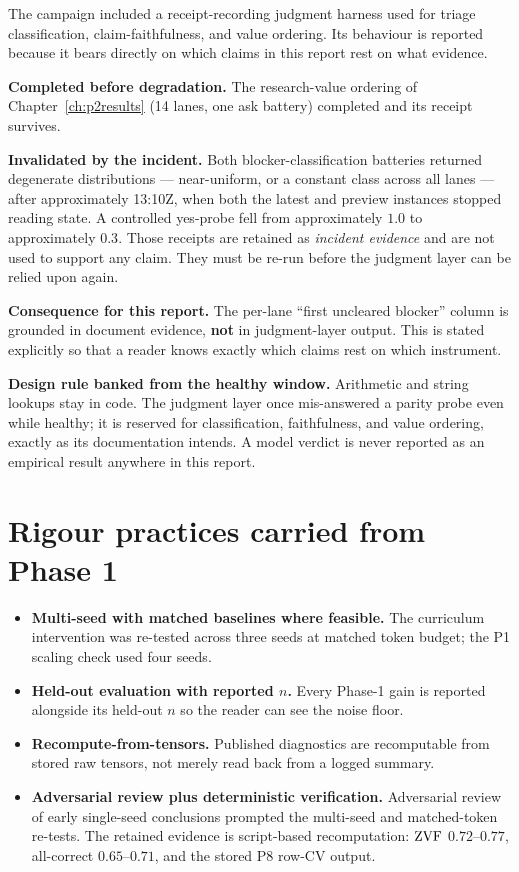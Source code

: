 The campaign included a receipt-recording judgment harness used for triage
classification, claim-faithfulness, and value ordering. Its behaviour is reported
because it bears directly on which claims in this report rest on what evidence.

\textbf{Completed before degradation.} The research-value ordering of
Chapter~\ref{ch:p2results} (14 lanes, one ask battery) completed and its receipt
survives.

\textbf{Invalidated by the incident.} Both blocker-classification batteries
returned degenerate distributions --- near-uniform, or a constant class across all
lanes --- after approximately 13:10Z, when both the latest and preview instances
stopped reading state. A controlled yes-probe fell from approximately $1.0$ to
approximately $0.3$. Those receipts are retained as \emph{incident evidence} and
are not used to support any claim. They must be re-run before the judgment layer
can be relied upon again.

\textbf{Consequence for this report.} The per-lane ``first uncleared blocker''
column is grounded in document evidence, \textbf{not} in judgment-layer output.
This is stated explicitly so that a reader knows exactly which claims rest on
which instrument.

\textbf{Design rule banked from the healthy window.} Arithmetic and string
lookups stay in code. The judgment layer once mis-answered a parity probe even
while healthy; it is reserved for classification, faithfulness, and value
ordering, exactly as its documentation intends. A model verdict is never reported
as an empirical result anywhere in this report.

\section{Rigour practices carried from Phase 1}

\begin{itemize}[leftmargin=1.4em,itemsep=2pt]
  \item \textbf{Multi-seed with matched baselines where feasible.} The curriculum
  intervention was re-tested across three seeds at matched token budget; the P1
  scaling check used four seeds.
  \item \textbf{Held-out evaluation with reported $n$.} Every Phase-1 gain is
  reported alongside its held-out $n$ so the reader can see the noise floor.
  \item \textbf{Recompute-from-tensors.} Published diagnostics are recomputable
  from stored raw tensors, not merely read back from a logged summary.
  \item \textbf{Adversarial review plus deterministic verification.} Adversarial
  review of early single-seed conclusions prompted the multi-seed and matched-token
  re-tests. The retained evidence is script-based recomputation: $\mathrm{ZVF}$
  $0.72$--$0.77$, all-correct $0.65$--$0.71$, and the stored P8 row-CV output.
\end{itemize}


